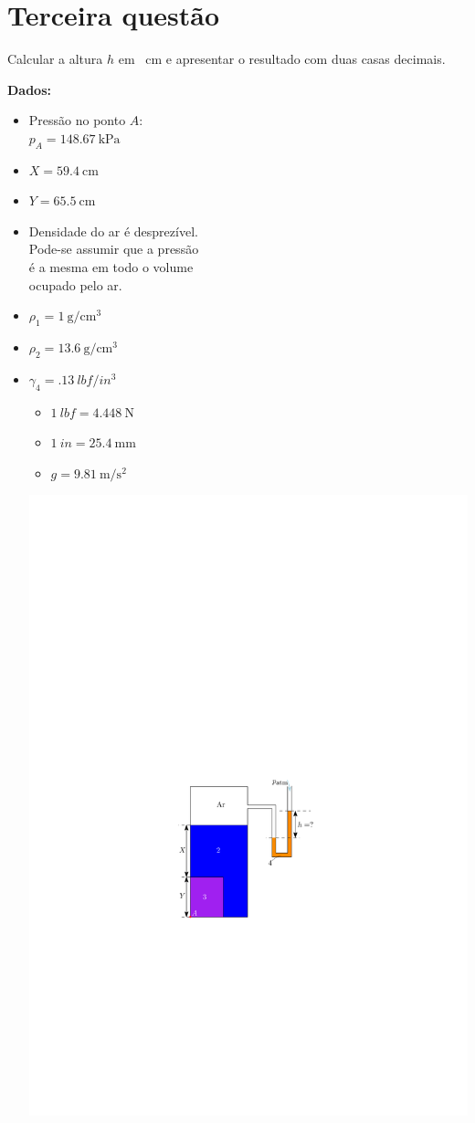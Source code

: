 \documentclass[
	a4paper,
	12pt,
	brazilian
]{article}
\begin{document}
	\section{Terceira questão}
	Calcular a altura $h$ em \SI{}{\centi\meter} e apresentar o resultado com duas casas decimais.\\\vspace{.5cm}
	
	\textbf{Dados:}
	\begin{itemize}
		\item Pressão no ponto $A$:\\ 
		$p_{A}=\SI{148.67}{\kilo\pascal}$
		\item $X=\SI{59.4}{\centi\meter}$
		\item $Y=\SI{65.5}{\centi\meter}$
		\item Densidade do ar é desprezível.\\
		Pode-se assumir que a pressão\\
		é a mesma em todo o volume\\
		ocupado pelo ar.
		\item $\rho_{1}=\SI{1}{\gram/\centi\meter^{3}}$
		\item $\rho_{2}=\SI{13.6}{\gram/\centi\meter^{3}}$
		\item $\gamma_{4}=\SI{.13}{lbf/in^{3}}$
		\begin{itemize}
			\item $\SI{1}{lbf}=\SI{4.448}{\newton}$
			\item $\SI{1}{in}=\SI{25.4}{\milli\meter}$
			\item $g=\SI{9.81}{\meter/\second^{2}}$
		\end{itemize}
		\vspace{-11cm}
		\begin{flushright}
			\includegraphics[width=.6\linewidth]{assets/images/ex3}
		\end{flushright}
	\end{itemize}
\end{document}
